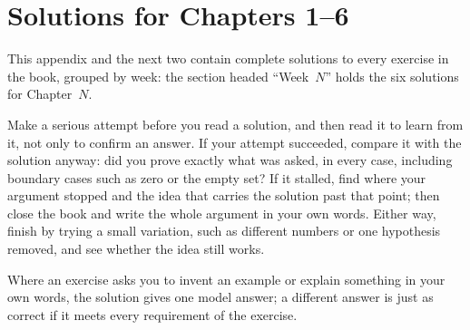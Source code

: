 \chapter{Solutions for Chapters 1--6}\label{app:sola}
This appendix and the next two contain complete solutions to every exercise in the book, grouped by week: the section headed ``Week~$N$'' holds the six solutions for Chapter~$N$.

Make a serious attempt before you read a solution, and then read it to learn from it, not only to confirm an answer. If your attempt succeeded, compare it with the solution anyway: did you prove exactly what was asked, in every case, including boundary cases such as zero or the empty set? If it stalled, find where your argument stopped and the idea that carries the solution past that point; then close the book and write the whole argument in your own words. Either way, finish by trying a small variation, such as different numbers or one hypothesis removed, and see whether the idea still works.

Where an exercise asks you to invent an example or explain something in your own words, the solution gives one model answer; a different answer is just as correct if it meets every requirement of the exercise.







